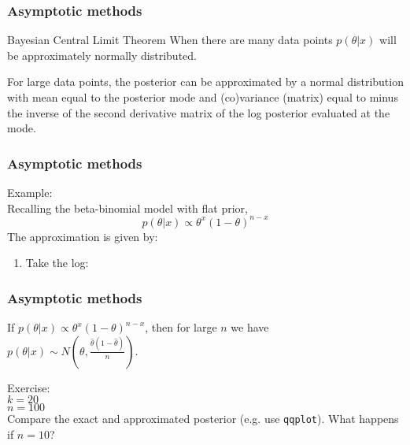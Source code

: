 \documentclass{beamer}
\newcommand{\1}{\ensuremath{\mathbf{1}}}
\begin{document}
%
%
%
\begin{frame}\frametitle{Asymptotic methods}
	\begin{block}{Bayesian Central Limit Theorem}
		When there are many data points $p(\theta|x)$ will be approximately normally distributed.
	\end{block}
	For large data points, the posterior can be approximated by a normal distribution with mean equal to the posterior mode and (co)variance (matrix) equal to minus the inverse of the second derivative matrix of the log posterior evaluated at the mode.
\end{frame}
%
%
%
\begin{frame}\frametitle{Asymptotic methods}
	Example:\\
	Recalling the beta-binomial model with flat prior,\\
	\begin{equation}
		p(\theta|x) \propto \theta^x (1-\theta)^{n-x}
	\end{equation}
	The approximation is given by:
	\begin{enumerate}
		\item Take the log: \visible<2-5>{$l(\theta) = x \log\theta + (n-x) \log(1-\theta)$}
	\end{enumerate}
\end{frame}
%
%
%
\begin{frame}\frametitle{Asymptotic methods}
	\begin{block}{}
		If $p(\theta|x) \propto \theta^x (1-\theta)^{n-x}$, then for large $n$ we have\\ $p(\theta|x) \sim N(\theta,\tfrac{\hat\theta (1-\hat\theta)}{n})$.
	\end{block}
	Exercise:\\
	$k = 20$\\
	$n = 100$\\
	Compare the exact and approximated posterior (e.g. use \texttt{qqplot}). What happens if $n = 10$?
\end{frame}
\end{document}
